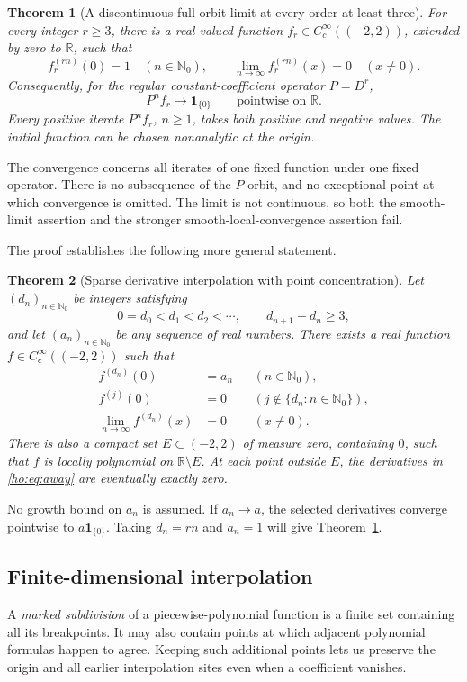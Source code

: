 \documentclass[11pt,reqno]{amsart}
\numberwithin{equation}{section}
\newtheorem{theorem}{Theorem}[section]
\theoremstyle{definition}
\theoremstyle{remark}
\newcommand{\R}{\mathbb R}
\newcommand{\N}{\mathbb N_0}
\newcommand{\ind}{\mathbf 1}
\begin{document}
\begin{theorem}[A discontinuous full-orbit limit at every order at least three]\label{ho:thm:counter}
For every integer $r\ge3$, there is a real-valued function $f_r\in C_c^\infty((-2,2))$, extended by zero to $\R$, such that
\begin{equation}\label{ho:eq:counter}
 f_r^{(rn)}(0)=1\quad(n\in\N),\qquad
 \lim_{n\to\infty}f_r^{(rn)}(x)=0\quad(x\ne0).
\end{equation}
Consequently, for the regular constant-coefficient operator $P=D^r$,
\[
 P^nf_r\longrightarrow\ind_{\{0\}}\qquad\text{pointwise on }\R.
\]
Every positive iterate $P^nf_r$, $n\ge1$, takes both positive and negative values. The initial function can be chosen nonanalytic at the origin.
\end{theorem}

The convergence concerns all iterates of one fixed function under one fixed operator. There is no subsequence of the $P$-orbit, and no exceptional point at which convergence is omitted. The limit is not continuous, so both the smooth-limit assertion and the stronger smooth-local-convergence assertion fail.

The proof establishes the following more general statement.
\begin{theorem}[Sparse derivative interpolation with point concentration]\label{ho:thm:sparse}
Let $(d_n)_{n\in\N}$ be integers satisfying
\[
 0=d_0<d_1<d_2<\cdots,\qquad d_{n+1}-d_n\ge3,
\]
and let $(a_n)_{n\in\N}$ be any sequence of real numbers. There exists a real function $f\in C_c^\infty((-2,2))$ such that
\begin{align}
 f^{(d_n)}(0)&=a_n &&(n\in\N),\label{ho:eq:prescribed}\\
 f^{(j)}(0)&=0 &&(j\notin\{d_n:n\in\N\}),\label{ho:eq:unused}\\
 \lim_{n\to\infty} f^{(d_n)}(x)&=0 &&(x\ne0).\label{ho:eq:away}
\end{align}
There is also a compact set $E\subset(-2,2)$ of measure zero, containing $0$, such that $f$ is locally polynomial on $\R\setminus E$. At each point outside $E$, the derivatives in \eqref{ho:eq:away} are eventually exactly zero.
\end{theorem}

No growth bound on $a_n$ is assumed. If $a_n\to a$, the selected derivatives converge pointwise to $a\ind_{\{0\}}$. Taking $d_n=rn$ and $a_n=1$ will give Theorem~\ref{ho:thm:counter}.

\subsection{Finite-dimensional interpolation}
A \emph{marked subdivision} of a piecewise-polynomial function is a finite set containing all its breakpoints. It may also contain points at which adjacent polynomial formulas happen to agree. Keeping such additional points lets us preserve the origin and all earlier interpolation sites even when a coefficient vanishes.
\end{document}

